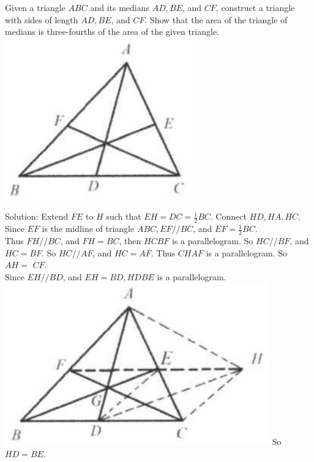 \documentclass{article}
\begin{document}
Given a triangle \(A B C\) and its medians \(A D, B E\), and \(C F\), construct a triangle with sides of length \(A D, B E\), and \(C F\). Show that the area of the triangle of medians is three-fourths of the area of the given triangle.\\
\centering
\includegraphics[width=\textwidth]{images/040(2).jpg}


Solution:
Extend \(F E\) to \(H\) such that \(E H=D C=\frac{1}{2} B C\). Connect \(H D, H A, H C\).\\
Since \(E F\) is the midline of triangle \(A B C, E F / / B C\), and \(E F=\frac{1}{2} B C\).\\
Thus \(F H / / B C\), and \(F H=B C\), then \(H C B F\) is a parallelogram. So \(H C / / B F\), and \(H C=B F\). So \(H C / / A F\), and \(H C=A F\). Thus \(C H A F\) is a parallelogram. So \(A H=\) \(C F\).\\
Since \(E H / / B D\), and \(E H=B D, H D B E\) is a parallelogram.\\
\includegraphics[width=\textwidth]{images/041.jpg} So \(H D=B E\).
\end{document}
